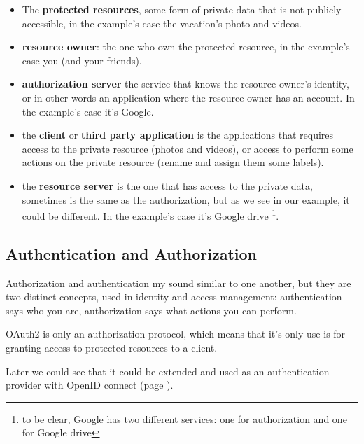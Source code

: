\documentclass[11pt]{style}
\begin{document}
\begin{itemize}
    \item The \textbf{protected resources}, some form of private data that is
        not publicly accessible, in the example's case the vacation's photo and
        videos.
    \item \textbf{resource owner}: the one who own the protected resource, in
        the example's case you (and your friends).
    \item \textbf{authorization server} the service that knows the resource
        owner's identity, or in other words an application where the resource
        owner has an account. In the example's case it's Google.
    \item the \textbf{client} or \textbf{third party application} is the
        applications that requires access to the private resource (photos and
        videos), or access to perform some actions on the private resource
        (rename and assign them some labels).
    \item the \textbf{resource server} is the one that has access to the private
        data, sometimes is the same as the authorization, but as we see in our
        example, it could be different.
        In the example's case it's Google drive \footnote{to be clear, Google
        has two different services: one for authorization and one for Google
        drive}.
\end{itemize}

\subsection{Authentication and Authorization}
Authorization and authentication my sound similar to one another, but they are
two distinct concepts, used in identity and access management:
authentication says who you are, authorization says what actions you can
perform.

OAuth2 is only an authorization protocol, which means that it's only use is for
granting access to protected resources to a client.

Later we could see that it could be extended and used as an authentication
provider with OpenID connect (page \pageref{openid}).
\end{document}
